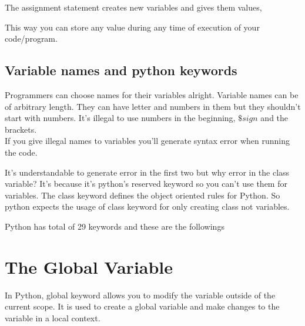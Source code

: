 \noindent The assignment statement creates new variables and gives them values,

\noindent\begin{minipage}{\linewidth}

\end{minipage}


\noindent This way you can store any value during any time of execution of your code/program.


\subsection{Variable names and python keywords}
\noindent Programmers can choose names for their variables alright. Variable names can be of arbitrary length. They can have letter and numbers in them but they shouldn't start with numbers. It's illegal to use numbers in the beginning, $ \$ sign$ and the brackets. \\

If you give illegal names to variables you'll generate syntax error when running the code.

\noindent\begin{minipage}{\linewidth}

\end{minipage}

\noindent It's understandable to generate error in the first two but why error in the class variable? It's because it's python's reserved keyword so you can't use them for variables. The class keyword defines the object oriented rules for Python. So python expects the usage of class keyword for only creating class not variables.

\noindent Python has total of 29 keywords and these are the followings\\

\noindent\begin{minipage}{\linewidth}

\end{minipage}

\section{The Global Variable}
In Python, global keyword allows you to modify the variable outside of the current scope. It is used to create a global variable and make changes to the variable in a local context.

